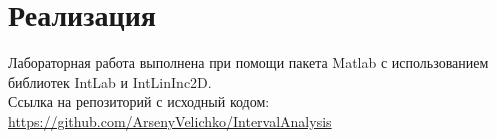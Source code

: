 \section{Реализация}
Лабораторная работа выполнена при помощи пакета Matlab с использованием библиотек IntLab и IntLinInc2D.\\
Ссылка на репозиторий с исходный кодом:\\
\url{https://github.com/ArsenyVelichko/IntervalAnalysis}